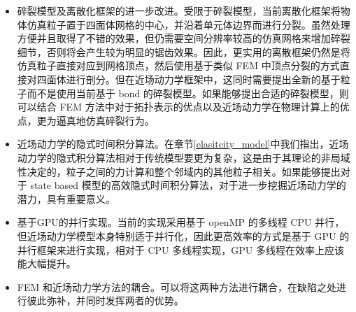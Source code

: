 \begin{itemize}
  \item 碎裂模型及离散化框架的进一步改进。受限于碎裂模型，当前离散化框架将物体仿真粒子置于四面体网格的中心，并沿着单元体边界而进行分裂。虽然处理方便并且取得了不错的效果，但仍需要空间分辨率较高的仿真网格来增加碎裂细节，否则将会产生较为明显的锯齿效果。因此，更实用的离散框架仍然是将仿真粒子直接对应到网格顶点，然后使用基于类似 FEM 中顶点分裂的方式直接对四面体进行剖分。但在近场动力学框架中，这同时需要提出全新的基于粒子而不是使用当前基于 bond 的碎裂模型。如果能够提出合适的碎裂模型，则可以结合 FEM 方法中对于拓扑表示的优点以及近场动力学在物理计算上的优点，更为逼真地仿真碎裂行为。
  \item 近场动力学的隐式时间积分算法。在章节\ref{elasitcity_model}中我们指出，近场动力学的隐式积分算法相对于传统模型要更为复杂，这是由于其理论的非局域性决定的，粒子之间的力计算和整个邻域内的其他粒子相关。如果能够提出对于 state based 模型的高效隐式时间积分算法，对于进一步挖掘近场动力学的潜力，具有重要意义。
  \item 基于GPU的并行实现。当前的实现采用基于 openMP 的多线程 CPU 并行，但近场动力学模型本身特别适于并行化，因此更高效率的方式是基于 GPU 的并行框架来进行实现，相对于 CPU 多线程实现，GPU 多线程在效率上应该能大幅提升。
  \item FEM 和近场动力学方法的耦合。可以将这两种方法进行耦合，在缺陷之处进行彼此弥补，并同时发挥两者的优势。
\end{itemize}
